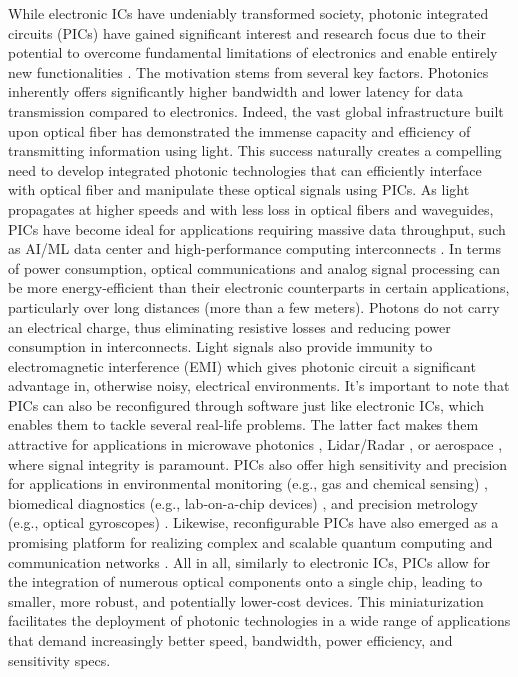 While electronic ICs have undeniably transformed society, photonic integrated circuits (PICs) have gained significant interest and research focus due to their potential to overcome fundamental limitations of electronics and enable entirely new functionalities \cite{soref_past_2006,ye_review_2013,baets_silicon_2017}.
The motivation stems from several key factors.
Photonics inherently offers significantly higher bandwidth and lower latency for data transmission compared to electronics.
Indeed, the vast global infrastructure built upon optical fiber has demonstrated the immense capacity and efficiency of transmitting information using light.
This success naturally creates a compelling need to develop integrated photonic technologies that can efficiently interface with optical fiber and manipulate these optical signals using PICs.
As light propagates at higher speeds and with less loss in optical fibers and waveguides, PICs have become ideal for applications requiring massive data throughput, such as AI/ML data center and high-performance computing interconnects \cite{khani_sip-ml_2021,li_silicon_2015,zhou_development_2018}.
In terms of power consumption, optical communications and analog signal processing can be more energy-efficient than their electronic counterparts in certain applications, particularly over long distances (more than a few meters).
Photons do not carry an electrical charge, thus eliminating resistive losses and reducing power consumption in interconnects.
Light signals also provide immunity to electromagnetic interference (EMI) which gives photonic circuit a significant advantage in, otherwise noisy, electrical environments.
It's important to note that PICs can also be reconfigured through software just like electronic ICs, which enables them to tackle several real-life problems.
The latter fact makes them attractive for applications in microwave photonics \cite{chen_silicon_2017,marpaung_integrated_2019}, Lidar/Radar \cite{hashemi_review_2022,serafino_toward_2019}, or aerospace \cite{hsu_free-space_2022}, where signal integrity is paramount.
PICs also offer high sensitivity and precision for applications in environmental monitoring (e.g., gas and chemical sensing) \cite{chrostowski_silicon_2012}, biomedical diagnostics (e.g., lab-on-a-chip devices) \cite{fathpour_silicon_2011}, and precision metrology (e.g., optical gyroscopes) \cite{weimann_silicon_2017,khial_nanophotonic_2018}.
Likewise, reconfigurable PICs have also emerged as a promising platform for realizing complex and scalable quantum computing and communication networks \cite{harris_large-scale_2016,sibson_integrated_2017}.
All in all, similarly to electronic ICs, PICs allow for the integration of numerous optical components onto a single chip, leading to smaller, more robust, and potentially lower-cost devices.
This miniaturization facilitates the deployment of photonic technologies in a wide range of applications that demand increasingly better speed, bandwidth, power efficiency, and sensitivity specs.

